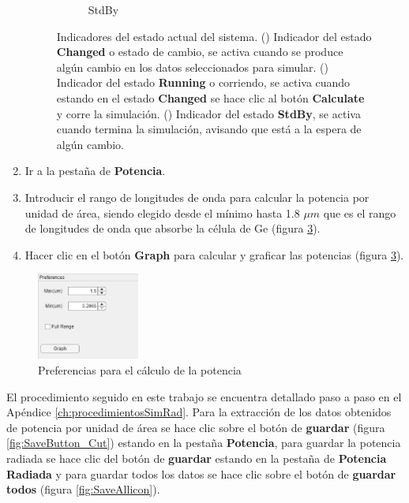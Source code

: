 \begin{enumerate}
\begin{figure}[H]
\begin{subfigure}[b]{0.3\textwidth}
	\caption{StdBy}%
	\label{fig:indicador_StdBy}%
	\end{subfigure}
	\hfill
	\caption{Indicadores del estado actual del sistema. () Indicador del estado \textbf{Changed} o estado de cambio, se activa cuando se produce algún cambio en los datos seleccionados para simular. () Indicador del estado \textbf{Running} o corriendo, se activa cuando estando en el estado \textbf{Changed} se hace clic al botón \textbf{Calculate} y corre la simulación. () Indicador del estado \textbf{StdBy}, se activa cuando termina la simulación, avisando que está a la espera de algún cambio.}
	\label{fig:indicadorLED}
	\end{figure}
	\item Ir a la pestaña de \textbf{Potencia}.
	\item Introducir el rango de longitudes de onda para calcular la potencia por unidad de área, siendo elegido desde el mínimo hasta 1.8 $\mu m$ que es el rango de longitudes de onda que absorbe la célula de Ge (figura \ref{fig:graficar_ejemplo2}).
	\item Hacer clic en el botón \textbf{Graph} para calcular y graficar las potencias (figura \ref{fig:graficar_ejemplo2}).
\end{enumerate}
\begin{figure}[H]
	\centering
	\includegraphics[width=0.30\textwidth]{figuras/Procedimiento_Simulaciones/Radiacion/graficar_ejemplo2.png}
	\caption{Preferencias para el cálculo de la potencia}
	\label{fig:graficar_ejemplo2}
\end{figure}
El procedimiento seguido en este trabajo se encuentra detallado paso a paso en el Apéndice \ref{ch:procedimientosSimRad}. Para la extracción de los datos obtenidos de potencia por unidad de área se hace clic sobre el botón de \textbf{guardar} (figura \ref{fig:SaveButton_Cut}) estando en la pestaña \textbf{Potencia}, para guardar la potencia radiada se hace clic del botón de \textbf{guardar} estando en la pestaña de \textbf{Potencia Radiada} y para guardar todos los datos se hace clic sobre el botón de \textbf{guardar todos} (figura \ref{fig:SaveAllicon}).
